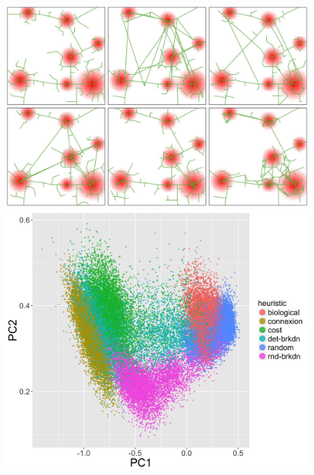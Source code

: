 \documentclass[letterpaper]{article}
\begin{document}
\begin{figure}[t]
\begin{minipage}[c]{0.45\linewidth}
\includegraphics[width=\linewidth]{figures/7-1-2-fig-networkgrowth-examples.jpg}\\
\includegraphics[width=\linewidth]{figures/7-1-2-fig-networkgrowth-feasiblespace.jpg}\\
\end{minipage}
\begin{minipage}[c]{0.55\linewidth}

\end{minipage}
\end{figure}
\end{document}
